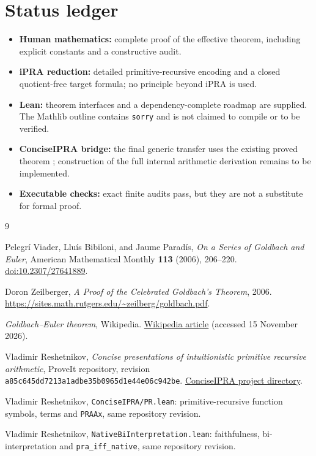 \documentclass[11pt]{article}
\theoremstyle{definition}
\begin{document}
\section{Status ledger}

\begin{itemize}
\item \textbf{Human mathematics:} complete proof of the effective theorem,
      including explicit constants and a constructive audit.
\item \textbf{iPRA reduction:} detailed primitive-recursive encoding and a
      closed quotient-free target formula; no principle beyond iPRA is used.
\item \textbf{Lean:} theorem interfaces and a dependency-complete roadmap are
      supplied.  The Mathlib outline contains \texttt{sorry} and is not
      claimed to compile or to be verified.
\item \textbf{ConciseIPRA bridge:} the final generic transfer uses the existing
      proved theorem ; construction of the full
      internal arithmetic derivation remains to be implemented.
\item \textbf{Executable checks:} exact finite audits pass, but they are not a
      substitute for formal proof.
\end{itemize}

\begin{thebibliography}{9}

Pelegr\'i Viader, Llu\'is Bibiloni, and Jaume Parad\'is,
\emph{On a Series of Goldbach and Euler},
American Mathematical Monthly \textbf{113} (2006), 206--220.
\href{https://doi.org/10.2307/27641889}{doi:10.2307/27641889}.

Doron Zeilberger,
\emph{A Proof of the Celebrated Goldbach's Theorem}, 2006.
\url{https://sites.math.rutgers.edu/~zeilberg/goldbach.pdf}.

\emph{Goldbach--Euler theorem}, Wikipedia.
\href{https://en.wikipedia.org/wiki/Goldbach\%E2\%80\%93Euler_theorem}{Wikipedia article}
(accessed 15 November 2026).

Vladimir Reshetnikov,
\emph{Concise presentations of intuitionistic primitive recursive arithmetic},
ProveIt repository, revision
\texttt{a85c645dd7213a1adbe35b0965d1e44e06c942be}.
\href{https://github.com/VladimirReshetnikov/ProveIt/tree/main/Logic/PrimitiveRecursiveArithmetic/ConciseIPRA}{ConciseIPRA project directory}.

Vladimir Reshetnikov,
\texttt{ConciseIPRA/PR.lean}: primitive-recursive function symbols, terms and
\texttt{PRAAx}, same repository revision.

Vladimir Reshetnikov,
\texttt{NativeBiInterpretation.lean}: faithfulness,
bi-interpretation and \texttt{pra\_iff\_native}, same repository revision.

\end{thebibliography}
\end{document}
